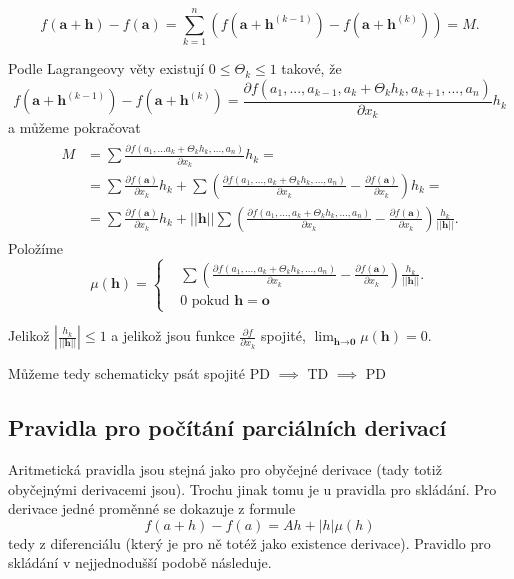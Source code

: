 \documentclass[../main.tex]{subfiles}
\begin{document}
\[f(\textbf{a}+\textbf{h}) - f(\textbf{a}) = \sum^n_{k=1}(f(\textbf{a}+\textbf{h}^{(k-1)})-f(\textbf{a}+\textbf{h}^{(k)})) = M.\]

\noindent
\hspace{1.2mm}
Podle Lagrangeovy věty existují $0 \leq \Theta_k \leq 1$ takové, že
\[f(\textbf{a}+\textbf{h}^{(k-1)})-f(\textbf{a}+\textbf{h}^{(k)}) = \frac{\partial f(a_1,...,a_{k-1},a_k+ \Theta_kh_k,a_{k+1},...,a_n)}{\partial x_k}h_k\]
a můžeme pokračovat
\begin{align*} 
\begin{split}
M & = \sum\frac{\partial f(a_1,...a_k+\Theta_kh_k,...,a_n)}{\partial x_k}h_k = \\
 & = \sum \frac{\partial f(\textbf{a})}{\partial x_k}h_k + \sum \left( \frac{\partial f(a_1,...,a_k+\Theta_kh_k,...,a_n)}{\partial x_k}
 - \frac{\partial f(\textbf{a})}{\partial x_k} \right)h_k = \\
 & = \sum \frac{\partial f(\textbf{a})}{\partial x_k}h_k + ||\textbf{h}||\sum\left(\frac{\partial f(a_1,...,a_k+\Theta_kh_k,...,a_n)}
 {\partial x_k}- \frac{\partial f(\textbf{a})}{\partial x_k}\right)\frac{h_k}{||\textbf{h}||}.
\end{split}
\end{align*}
Položíme
\[\mu (\textbf{h}) =
    \begin{cases} & \sum\left(\frac{\partial f(a_1,...,a_k+\Theta_kh_k,...,a_n)}{\partial x_k} -
    \frac{\partial f(\textbf{a})}{\partial x_k} \right)\frac{h_k}{||\textbf{h}||}.\\
    & 0 \text{ pokud } \mathbf{h} = \mathbf{o}
    \end{cases}\]

    Jelikož $\left|\frac{h_k}{||\textbf{h}||}\right| \leq 1$ a jelikož jsou funkce $\frac{\partial f}{\partial x_k}$ spojité,
    $\lim_{\textbf{h}\rightarrow \textbf{0}} \mu (\textbf{h}) = 0$.

    \begin{center}
    \LARGE 
    Můžeme tedy schematicky psát
    \LARGE 
    spojité PD $\implies$ TD $\implies$ PD
    \end{center}
\noindent

\subsection{Pravidla pro počítání parciálních derivací}
\hspace{1.2mm}
\noindent
Aritmetická pravidla jsou stejná jako pro obyčejné derivace (tady totiž obyčejnými derivacemi jsou).
Trochu jinak tomu je u pravidla pro skládání. Pro derivace jedné proměnné se dokazuje z formule
\[ f(a+h) - f(a) = Ah + |h|\mu (h) \]
tedy z diferenciálu (který je pro ně totéž jako existence derivace).
Pravidlo pro skládání v nejjednodušší podobě následuje.
\end{document}
